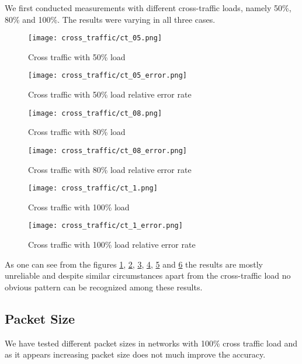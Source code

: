 We first conducted measurements with different cross-traffic loads, namely 50\%, 80\% and 100\%. The results were varying in all three cases. 

\begin{figure}[H]
 \centering
 \texttt{[image: cross\_traffic/ct\_05.png]}
 \caption{Cross traffic with 50\% load}
 \label{ct_05}
\end{figure}

\begin{figure}[H]
 \centering
 \texttt{[image: cross\_traffic/ct\_05\_error.png]}
 \caption{Cross traffic with 50\% load relative error  rate}
 \label{ct_05_error}
\end{figure}


\begin{figure}[H]
 \centering
 \texttt{[image: cross\_traffic/ct\_08.png]}
 \caption{Cross traffic with 80\% load}
 \label{ct_08}
\end{figure}

\begin{figure}[H]
 \centering
 \texttt{[image: cross\_traffic/ct\_08\_error.png]}
 \caption{Cross traffic with 80\% load relative error  rate}
 \label{ct_08_error}
\end{figure}

\begin{figure}[H]
 \centering
 \texttt{[image: cross\_traffic/ct\_1.png]}
 \caption{Cross traffic with 100\% load}
 \label{ct_10}
\end{figure}

\begin{figure}[H]
 \centering
 \texttt{[image: cross\_traffic/ct\_1\_error.png]}
 \caption{Cross traffic with 100\% load relative error  rate}
 \label{ct_1_error}
\end{figure}

As one can see from the figures \ref{ct_05}, \ref{ct_05_error}, \ref{ct_08}, \ref{ct_08_error}, \ref{ct_10} and \ref{ct_1_error} the results are mostly unreliable and despite similar circumstances apart from the cross-traffic load no obvious pattern can be recognized among these results.\\


\subsection{Packet Size}
We have tested different packet sizes in networks with 100\% cross traffic load and as it appears increasing packet size does not much improve the accuracy. 

